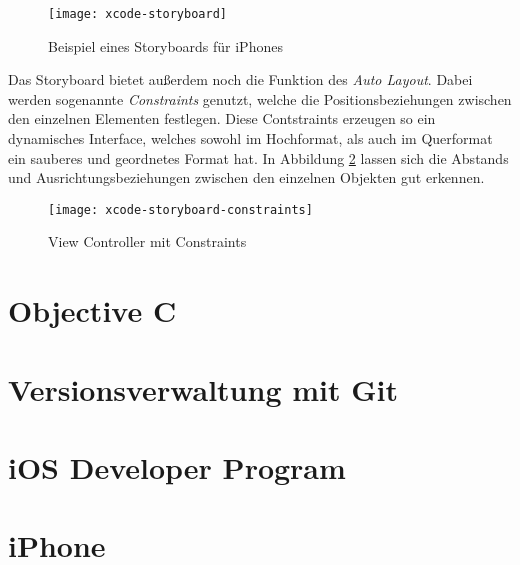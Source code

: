 \begin{figure}[htb!]
	\centering
	\texttt{[image: xcode-storyboard]}
	\caption{Beispiel eines Storyboards für iPhones}
	\label{xcode-storyboard}
\end{figure}

Das Storyboard bietet außerdem noch die Funktion des \emph{Auto Layout}. Dabei werden sogenannte \emph{Constraints} genutzt, welche die Positionsbeziehungen zwischen den einzelnen Elementen festlegen. Diese Contstraints erzeugen so ein dynamisches Interface, welches sowohl im Hochformat, als auch im Querformat ein sauberes und geordnetes Format hat.
In Abbildung \ref{xcode-storyboard-constraints} lassen sich die Abstands und Ausrichtungsbeziehungen zwischen den einzelnen Objekten gut erkennen.

\begin{figure}[htb!]
		\centering
	\texttt{[image: xcode-storyboard-constraints]}
	\caption{View Controller mit Constraints}
	\label{xcode-storyboard-constraints}
\end{figure}

\section{Objective C}
\label{sec:tools:objectivec}




\section{Versionsverwaltung mit Git}
\label{sec:tools:git}

\section{iOS Developer Program}
\label{sec:iosdevprogram}

\section{iPhone}
\label{sec:tools:iphone}
